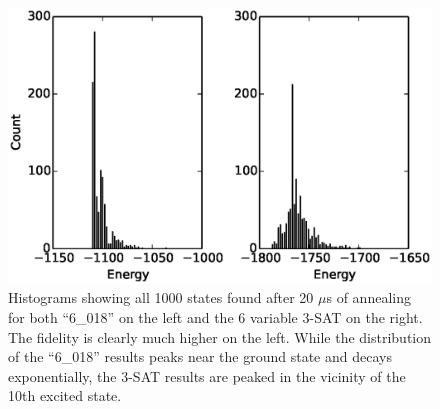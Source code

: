 \begin{figure}
	\includegraphics{img/hist.eps}
	\caption[20 $\mu$s Result State Histograms]{Histograms showing all 1000 states found after 20 $\mu$s of annealing for both ``6\_018'' on the left and the 6 variable 3-SAT on the right.  The fidelity is clearly much higher on the left.  While the distribution of the ``6\_018'' results peaks near the ground state and decays exponentially, the 3-SAT results are peaked in the vicinity of the 10th excited state.}
	\label{fig:test_6_hist}
\end{figure}

